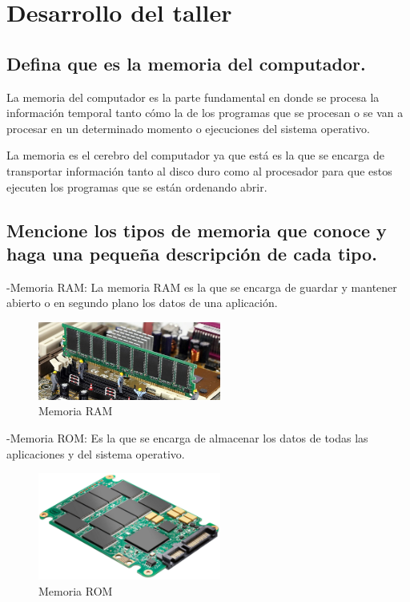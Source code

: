 \documentclass{article}
\begin{document}
\section{Desarrollo del taller} \label{contenido}

\subsection{Defina que es la memoria del computador.}
La memoria del computador es la parte fundamental en donde se procesa la información temporal tanto cómo la de los programas que se procesan o se van a procesar en un determinado momento o ejecuciones del sistema operativo.

La memoria es el cerebro del computador ya que está es la que se encarga de transportar información tanto al disco duro como al procesador para que estos ejecuten los programas que se están ordenando abrir.

\subsection{Mencione los tipos de memoria que conoce y haga una pequeña descripción de cada tipo.}
-Memoria RAM: La memoria RAM es la que se encarga de guardar y mantener abierto o en segundo plano los datos de una aplicación.\newline

\begin{figure}[h]
\includegraphics[width=6cm]{Memoria.jpg}
\centering
\caption{Memoria RAM}
\end{figure}

-Memoria ROM: Es la que se encarga de almacenar los datos de todas las aplicaciones y del sistema operativo.\newline

\begin{figure}[h]
\includegraphics[width=6cm]{ssd.jpg}
\centering
\caption{Memoria ROM}
\end{figure}
\end{document}
